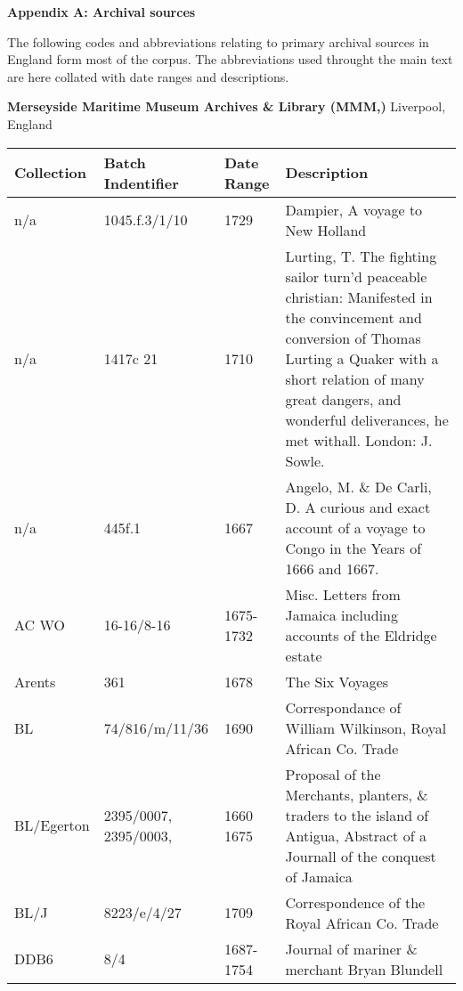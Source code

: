 \clearpage\begin{styleStandard}
\textbf{Appendix A: Archival sources}
\end{styleStandard}


\begin{styleStandard}
The following codes and abbreviations relating to primary archival sources in England form most of the corpus. The abbreviations used throught the main text are here collated with date ranges and descriptions. 
\end{styleStandard}

\begin{styleStandard}
\textbf{Merseyside Maritime Museum Archives \& Library (MMM,)} Liverpool, England
\end{styleStandard}

\begin{flushleft}
\tablehead{}
\begin{supertabular}{|m{0.86635983in}|m{1.4830599in}|m{0.8830598in}|m{2.4636598in}|}
\hline
\textbf{Collection} &
\textbf{Batch Indentifier}\footnotemark{} &
\textbf{Date Range} &
\textbf{Description}\\\hline
n/a &
1045.f.3/1/10 \  &
1729 &
Dampier, A voyage to New Holland\\\hline
n/a &
1417c 21 &
1710 &
Lurting, T. The fighting sailor turn’d peaceable christian: Manifested in the convincement and conversion of Thomas Lurting a Quaker with a short relation of many great dangers, and wonderful deliverances, he met withall. London: J. Sowle.\\\hline
n/a &
445f.1 &
1667 &
Angelo, M. \& De Carli, D. A curious and exact account of a voyage to Congo in the Years of 1666 and 1667.\\\hline
AC WO &
16-16/8-16 &
1675-1732 &
Misc. Letters from Jamaica including accounts of the Eldridge estate\\\hline
Arents &
361 &
1678 &
The Six Voyages\\\hline
BL &
74/816/m/11/36 &
1690 &
Correspondance of William Wilkinson, Royal African Co. Trade\\\hline
BL/Egerton &
2395/0007, 2395/0003,  &
1660 1675 &
Proposal of the Merchants, planters, \& traders to the island of Antigua, Abstract of a Journall of the conquest of Jamaica\\\hline
BL/J &
8223/e/4/27 &
1709 &
Correspondence of the Royal African Co. Trade\\\hline
DDB6  &
8/4 &
1687-1754 &
Journal of mariner \& merchant Bryan Blundell\\\hline

\end{supertabular}
\end{flushleft}
